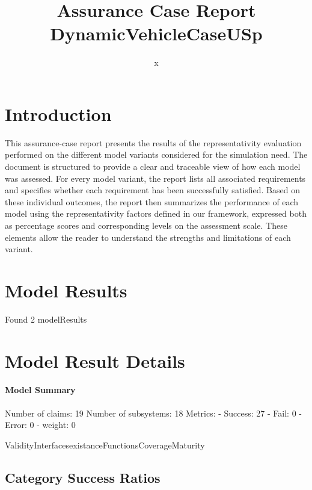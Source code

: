 \documentclass{article}
\title{Assurance Case Report DynamicVehicleCaseUSp}
\author{x}
\begin{document}
	\maketitle
	\section{Introduction}
	This assurance-case report presents the results of the 
	representativity evaluation performed on the different model variants considered for 
	the simulation need. The document is structured to provide a clear and traceable view of how 
	each model was assessed. For every model variant, the report lists all associated requirements
	 and specifies whether each requirement has been successfully satisfied. Based on these 
	individual outcomes, the report then summarizes the performance of each model using the 
	representativity factors defined in our framework, expressed both as percentage scores 
	and corresponding levels on the assessment scale. These elements allow the reader to understand 
	the strengths and limitations of each variant.
	 
	\section{Model Results}
    Found 2 modelResults
		
			\section{Model Result Details} 
			\paragraph{Model Summary}
			Number of claims: 19
			Number of subsystems: 18
			Metrics:
			- Success: 27
			- Fail: 0
			- Error: 0
			- weight: 0
			
			ValidityInterfacesexistanceFunctionsCoverageMaturity

					\subsection{Category Success Ratios}
						
\end{document}
